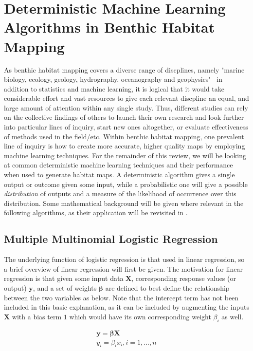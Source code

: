\section{Deterministic Machine Learning Algorithms in Benthic Habitat Mapping}
As benthic habitat mapping covers a diverse range of discplines, namely "marine biology, ecology, geology, hydrography, oceanography and geophysics"~\citep{cjbrown11} in addition to statistics and machine learning, it is logical that it would take considerable effort and vast resources to give each relevant discpline an equal, and large amount of attention within any single study. Thus, different studies can rely on the collective findings of others to launch their own research and look further into particular lines of inquiry, start new ones altogether, or evaluate effectiveness of methods used in the field/etc. Within benthic habitat mapping, one prevalent line of inquiry is how to create more accurate, higher quality maps by employing machine learning techniques. For the remainder of this review, we will be looking at common deterministic machine learning techniques and their performance when used to generate habitat maps. A deterministic algorithm gives a single output or outcome given some input, while a probabilistic one will give a possible \textit{distribution} of outputs and a measure of the likelihood of occurrence over this distribution. Some mathematical background will be given where relevant in the following algorithms, as their application will be revisited in .

\subsection{Multiple Multinomial Logistic Regression}
The underlying function of logistic regression is that used in linear regression, so a brief overview of linear regression will first be given. The motivation for linear regression is that given some input data $\mathbf{X}$, corresponding response values (or output) $\mathbf{y}$, and a set of weights $\mathbf{\beta}$ are defined to best define the relationship between the two variables as below. Note that the intercept term has not been included in this basic explanation, as it can be included by augmenting the inputs $\mathbf{X}$ with a bias term $1$ which would have its own corresponding weight $\beta_i$ as well.

\begin{equation}
\begin{split}
    \mathbf{y} = \mathbf{\beta X} \\
    y_i = \beta_i x_i,         i = 1,...,n
\end{split}
\end{equation}

